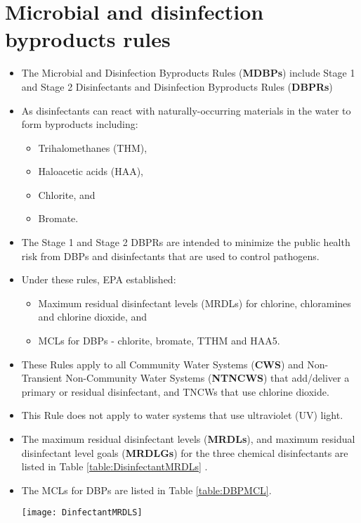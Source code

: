\section{Microbial and disinfection byproducts rules}
\begin{itemize}
\item The Microbial and Disinfection Byproducts Rules (\textbf{MDBPs}) include Stage 1 and Stage 2 Disinfectants and Disinfection Byproducts Rules (\textbf{DBPRs}) 
\item As disinfectants can react with naturally-occurring materials in the water to form byproducts including:
\begin{itemize}
\item Trihalomethanes (THM),
\item Haloacetic acids (HAA),
\item Chlorite, and
\item Bromate.
\end{itemize}
\item The Stage 1 and Stage 2 DBPRs are intended to minimize the public
health risk from DBPs and disinfectants that are used to control pathogens.
\item Under these rules, EPA established:
\begin{itemize}
\item Maximum residual disinfectant levels (MRDLs) for chlorine, chloramines and chlorine dioxide, and
\item  MCLs for DBPs - chlorite, bromate, TTHM and HAA5.
\end{itemize}
\item These Rules apply to all Community Water Systems (\textbf{CWS}) and Non-Transient Non-Community Water Systems (\textbf{NTNCWS}) that add/deliver a primary or residual disinfectant, and TNCWs that use chlorine dioxide. 
\item This Rule does not apply to water systems that use ultraviolet (UV) light.
\item The maximum residual disinfectant levels (\textbf{MRDLs}), and maximum residual disinfectant level goals (\textbf{MRDLGs}) for the three chemical disinfectants are listed in Table \ref{table:DisinfectantMRDLs} .
\item The MCLs for DBPs are listed in Table \ref{table:DBPMCL}.
\begin{table}[]
\begin{center}
\texttt{[image: DinfectantMRDLS]}

\end{center}
\end{table}
\end{itemize}
